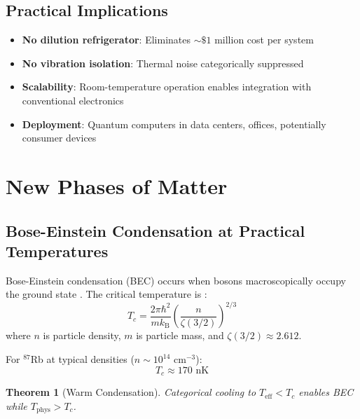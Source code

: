 \documentclass[twocolumn,10pt,twoside]{article}
\newtheorem{theorem}{Theorem}[section]
\newcommand{\kb}{k_{\mathrm{B}}}
\newcommand{\Teff}{T_{\mathrm{eff}}}
\newcommand{\Tphys}{T_{\mathrm{phys}}}
\begin{document}
\subsection{Practical Implications}

\begin{itemize}
    \item \textbf{No dilution refrigerator}: Eliminates $\sim \$1$ million cost per system

    \item \textbf{No vibration isolation}: Thermal noise categorically suppressed

    \item \textbf{Scalability}: Room-temperature operation enables integration with conventional electronics

    \item \textbf{Deployment}: Quantum computers in data centers, offices, potentially consumer devices
\end{itemize}

\section{New Phases of Matter}

\subsection{Bose-Einstein Condensation at Practical Temperatures}

Bose-Einstein condensation (BEC) occurs when bosons macroscopically occupy the ground state \cite{bose1924,einstein1925}. The critical temperature is \cite{pitaevskii2003}:
\begin{equation}
T_c = \frac{2\pi\hbar^2}{m\kb} \left(\frac{n}{\zeta(3/2)}\right)^{2/3}
\label{eq:bec_tc}
\end{equation}
where $n$ is particle density, $m$ is particle mass, and $\zeta(3/2) \approx 2.612$.

For $^{87}$Rb at typical densities ($n \sim 10^{14}$ cm$^{-3}$):
\begin{equation}
T_c \approx 170 \text{ nK}
\end{equation}

\begin{theorem}[Warm Condensation]
\label{thm:warm_bec}
Categorical cooling to $\Teff < T_c$ enables BEC while $\Tphys > T_c$.
\end{theorem}
\end{document}
